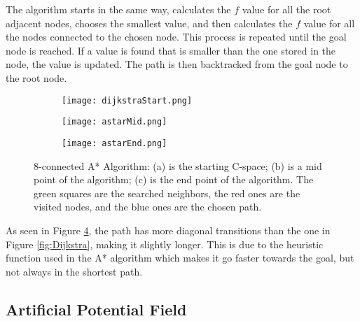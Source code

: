 The algorithm starts in the same way, calculates the $f$ value for all the root adjacent nodes, chooses the smallest value,
and then calculates the $f$ value for all the nodes connected to the chosen node. This process is repeated until the goal 
node is reached. If a value is found that is smaller than the one stored in the node, the value is updated. The path is then 
backtracked from the goal node to the root node.
\begin{figure}[htbp]
    \centering
    \begin{subfigure}[b]{0.3\textwidth}
        \centering
        \texttt{[image: dijkstraStart.png]} %
        \caption{}
        \label{subfig:astart}
    \end{subfigure}
    \hfill
    \begin{subfigure}[b]{0.3\textwidth}
        \centering
        \texttt{[image: astarMid.png]} %
        \caption{}
        \label{subfig:amid}
    \end{subfigure}
    \hfill
    \begin{subfigure}[b]{0.3\textwidth}
        \centering
        \texttt{[image: astarEnd.png]} %
        \caption{}
        \label{subfig:aend}
    \end{subfigure}
    \caption{8-connected A* Algorithm: (a) is the starting C-space; (b) is a mid point of the algorithm; (c) is the end point of the algorithm. The green squares are the searched neighbors, the red ones are the visited nodes, and the blue ones are the chosen path.}
    \label{fig:A*}
\end{figure}

As seen in Figure \ref{fig:A*}, the path has more diagonal transitions than the one in 
Figure \ref{fig:Dijkstra}, making it slightly longer. This is due to the heuristic function used in the A* algorithm which 
makes it go faster towards the goal, but not always in the shortest path.

\subsection{Artificial Potential Field}
\label{subsec:APF}

